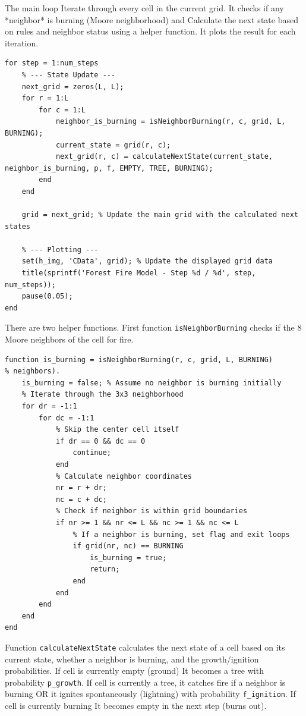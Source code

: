 \documentclass{article}
\begin{document}
The main loop Iterate through every cell in the current grid. It checks if any *neighbor* is burning (Moore neighborhood) and Calculate the next state based on rules and neighbor status using a helper function. It plots the result for each iteration.
\begin{lstlisting}[caption={Main code}]
for step = 1:num_steps
    % --- State Update ---
    next_grid = zeros(L, L); 
    for r = 1:L
        for c = 1:L 
            neighbor_is_burning = isNeighborBurning(r, c, grid, L, BURNING);
            current_state = grid(r, c);
            next_grid(r, c) = calculateNextState(current_state, neighbor_is_burning, p, f, EMPTY, TREE, BURNING);
        end
    end

    grid = next_grid; % Update the main grid with the calculated next states

    % --- Plotting ---
    set(h_img, 'CData', grid); % Update the displayed grid data
    title(sprintf('Forest Fire Model - Step %d / %d', step, num_steps));
    pause(0.05); 
end
\end{lstlisting}

There are two helper functions. First function  \texttt{isNeighborBurning} checks if the 8 Moore neighbors of the cell for fire. 

\begin{lstlisting}[caption={Helper functions}]
function is_burning = isNeighborBurning(r, c, grid, L, BURNING)
% neighbors).
    is_burning = false; % Assume no neighbor is burning initially
    % Iterate through the 3x3 neighborhood
    for dr = -1:1
        for dc = -1:1
            % Skip the center cell itself
            if dr == 0 && dc == 0
                continue;
            end
            % Calculate neighbor coordinates
            nr = r + dr;
            nc = c + dc;
            % Check if neighbor is within grid boundaries
            if nr >= 1 && nr <= L && nc >= 1 && nc <= L
                % If a neighbor is burning, set flag and exit loops
                if grid(nr, nc) == BURNING
                    is_burning = true;
                    return;
                end
            end
        end
    end
end

\end{lstlisting}

Function \texttt{calculateNextState} calculates the next state of a cell based on its current state, whether a neighbor is burning, and the growth/ignition probabilities. If cell is currently empty (ground) It becomes a tree with probability \texttt{p\_growth}.  If cell is currently a tree, it catches fire if a neighbor is burning OR it ignites spontaneously (lightning) with probability \texttt{f\_ignition}. If cell is currently burning It becomes empty in the next step (burns out).
\end{document}
